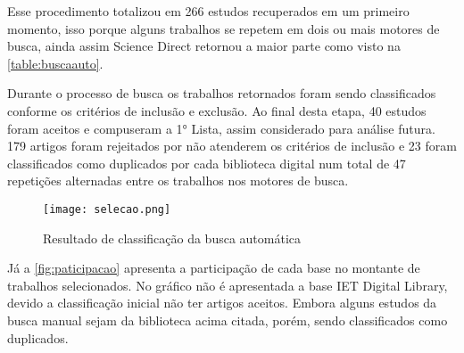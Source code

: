 Esse procedimento totalizou em 266 estudos recuperados em um primeiro momento, isso porque alguns trabalhos se repetem em dois ou mais motores de busca, ainda assim Science Direct retornou a maior parte como visto na \ref{table:buscaauto}.

Durante o processo de busca os trabalhos retornados foram sendo classificados conforme os critérios de inclusão e exclusão. Ao final desta etapa, 40 estudos foram aceitos e compuseram a 1° Lista, assim considerado para análise futura. 179 artigos foram rejeitados por não atenderem os critérios de inclusão e 23 foram classificados como duplicados por cada biblioteca digital num total de 47 repetições alternadas entre os trabalhos nos motores de busca.

\begin{figure}[htb]
	\centering
	\texttt{[image: selecao.png]}
	\caption{Resultado de classificação da busca automática}
	\label{fig:grafico}
\end{figure}


\begin{table}[]
	\centering
	\caption{Trabalhos retornados e aceitos das fontes eletrônicas}
	\label{table:buscaauto}
\end{table}

Já a \ref{fig:paticipacao} apresenta a participação de cada base no montante de trabalhos selecionados. No gráfico não é apresentada a base IET Digital Library, devido a classificação inicial não ter artigos aceitos. Embora alguns estudos da busca manual sejam da biblioteca acima citada, porém, sendo classificados como duplicados.


